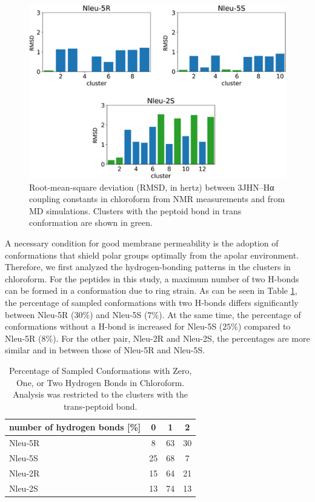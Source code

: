 \begin{figure}
    \centering
    \includegraphics[width=\textwidth]{7_chapter_5/fig/results/j3NMRConfClusterAna.jpeg}
    \caption{ Root-mean-square deviation (RMSD, in hertz) between 3JHN–Hα coupling constants in chloroform from NMR measurements and from MD simulations. Clusters with the peptoid bond in trans conformation are shown in green.}
    \label{fig: j3NMRConfClusterAna}
\end{figure}

A necessary condition for good membrane permeability is the adoption of conformations that shield polar groups optimally from the apolar environment. \cite{Sebastiano2018, Alex2011, Tyagi2018}
Therefore, we first analyzed the hydrogen-bonding patterns in the clusters in chloroform. For the peptides in this study, a maximum number of two H-bonds can be formed in a conformation due to ring strain. As can be seen in Table \ref{tab: hbondsratio}, the percentage of sampled conformations with two H-bonds differs significantly between Nleu-5R ($30\%$) and Nleu-5S ($7\%$). At the same time, the percentage of conformations without a H-bond is increased for Nleu-5S ($25\%$) compared to Nleu-5R ($8\%$). For the other pair, Nleu-2R and Nleu-2S, the percentages are more similar and in between those of Nleu-5R and Nleu-5S.


\begin{table}[]
    \centering
    \begin{tabular}{l|c|c|c}
    number of hydrogen bonds [\%] &	0 &	1 &	2 \\
    \hline
    Nleu-5R  &	8	& 63	& 30 \\
    Nleu-5S  &	25	& 68	& 7  \\
    Nleu-2R  &	15	& 64	& 21 \\
    Nleu-2S  &	13	& 74	& 13 \\
    \end{tabular}
    \caption{Percentage of Sampled Conformations with Zero, One, or Two Hydrogen Bonds in Chloroform. Analysis was restricted to the clusters with the trans-peptoid bond.}
    \label{tab: hbondsratio}
\end{table}

